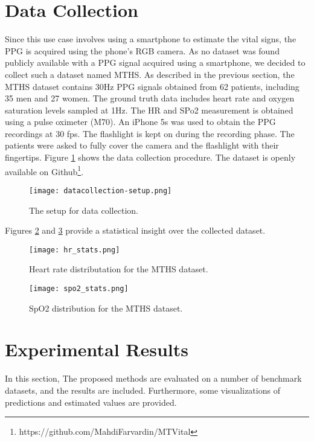\documentclass[conference]{IEEEtran}
\begin{document}
\section{Data Collection} \label{data_collection_sec}
Since this use case involves using a smartphone to estimate the vital signs, the PPG is acquired using the phone's RGB camera. As no dataset was found publicly available with a PPG signal acquired using a smartphone, we decided to collect such a dataset named MTHS. As described in the previous section, the MTHS dataset contains 30Hz PPG signals obtained from 62 patients, including 35 men and 27 women. The ground truth data includes heart rate and oxygen saturation levels sampled at 1Hz. The HR and SPo2 measurement is obtained using a pulse oximeter (M70). An iPhone 5s was used to obtain the PPG recordings at 30 fps. The flashlight is kept on during the recording phase. The patients were asked to fully cover the camera and the flashlight with their fingertips. Figure \ref{fig:setup-pics} shows the data collection procedure. The dataset is openly available on Github\footnote{https://github.com/MahdiFarvardin/MTVital}.

\begin{figure}[htbp]
    \centering
    \texttt{[image: datacollection-setup.png]}
    \caption{The setup for data collection.}
    \label{fig:setup-pics}
\end{figure}

Figures \ref{fig:BIDMC-hr-stats} and \ref{fig:BIDMC-spo2-stats} provide a statistical insight over the collected dataset.
\begin{figure}[htp]
    \centering
    \texttt{[image: hr\_stats.png]}
    \caption{Heart rate distributation for the MTHS dataset.}
    \label{fig:BIDMC-hr-stats}
\end{figure}

\begin{figure}[htp]
    \centering
    \texttt{[image: spo2\_stats.png]}
    \caption{SpO2 distribution for the MTHS dataset.}
    \label{fig:BIDMC-spo2-stats}
\end{figure}


\section{Experimental Results}
\label{section_exp_res}
In this section, The proposed methods are evaluated on a number of benchmark datasets, and the results are included. Furthermore, some visualizations of predictions and estimated values are provided.
\end{document}
